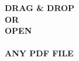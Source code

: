 \documentclass[letterpaper,9pt]{extarticle}
\title{\href{https://tylermorgan.co/}{ \alt{Tyler Morgan Logo}}}
\author{}
\date{}
\begin{document}
  \maketitle
  \vspace{-40pt}
  \noindent
  \center \textbf{\huge{\selectfont DRAG \& DROP \\
  OR \\
  OPEN \\~\\
  ANY PDF FILE}}
  \vfill 
\end{document}
